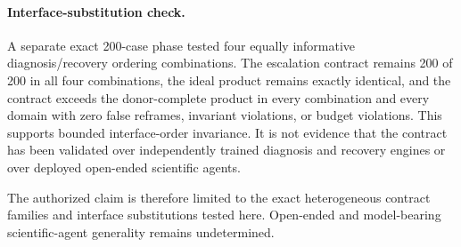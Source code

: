 \paragraph{Interface-substitution check.}
A separate exact 200-case phase tested four equally informative
diagnosis/recovery ordering combinations. The escalation contract remains 200 of
200 in all four combinations, the ideal product remains exactly identical, and
the contract exceeds the donor-complete product in every combination and every
domain with zero false reframes, invariant violations, or budget violations.
This supports bounded interface-order invariance. It is not evidence that the
contract has been validated over independently trained diagnosis and recovery
engines or over deployed open-ended scientific agents.

The authorized claim is therefore limited to the exact heterogeneous contract
families and interface substitutions tested here. Open-ended and model-bearing
scientific-agent generality remains undetermined.
